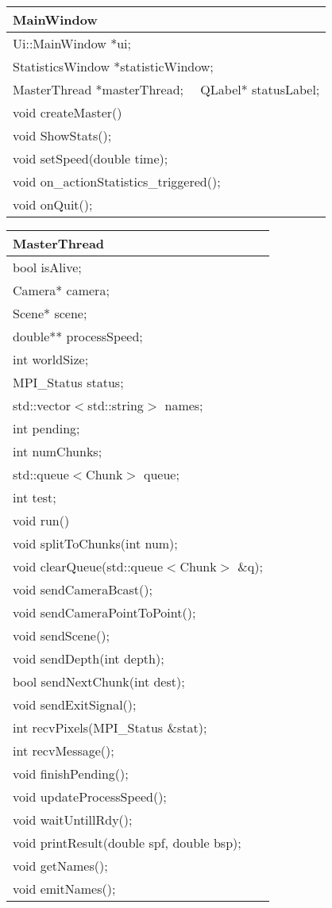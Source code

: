 \begin{center}
    \begin{tabular}{|l|}
    \hline
    MainWindow  \\ \hline
    Ui::MainWindow *ui; \\
    StatisticsWindow *statisticWindow; \\
    MasterThread *masterThread; \ \
    QLabel* statusLabel; \\ \hline
    void createMaster() \\
    void ShowStats(); \\
    void setSpeed(double time); \\
    void on\_actionStatistics\_triggered(); \\
    void onQuit(); \\ \hline
    \end{tabular}
\end{center}


\begin{center}
    \begin{tabular}{|l|}
    \hline
    MasterThread  \\ \hline
    bool isAlive; \\
    Camera* camera; \\
    Scene* scene; \\
     double** processSpeed; \\
         int worldSize; \\
    MPI\_Status status; \\
        std::vector$<$std::string$>$ names; \\
    int pending; \\
    int numChunks; \\
    std::queue$<$Chunk$>$ queue; \\
    int test; \\
    \hline
	void run() \\
	void splitToChunks(int num); \\
	 void clearQueue(std::queue$<$Chunk$>$ \&q); \\
    void sendCameraBcast(); \\
    void sendCameraPointToPoint(); \\
    void sendScene(); \\
    void sendDepth(int depth); \\
    bool sendNextChunk(int dest); \\
    void sendExitSignal(); \\
    int recvPixels(MPI\_Status \&stat); \\
    int recvMessage(); \\
    void finishPending(); \\
    void updateProcessSpeed(); \\
    void waitUntillRdy(); \\
    void printResult(double spf, double bsp); \\
    void getNames(); \\
    void emitNames(); \\
	\hline
    \end{tabular}
\end{center}


